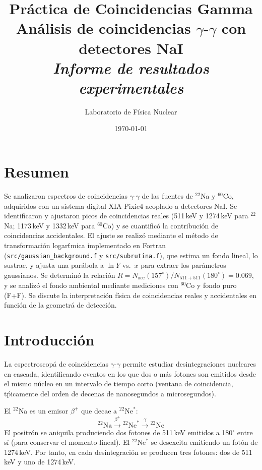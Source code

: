 \documentclass[12pt,a4paper]{article}
\title{\vspace{-1.5cm}\textbf{Pr\'actica de Coincidencias Gamma}\\
       \large An\'alisis de coincidencias $\gamma$-$\gamma$ con detectores NaI\\[0.3cm]
       \normalsize\textit{Informe de resultados experimentales}}
\author{Laboratorio de F\'isica Nuclear}
\date{\today}
\begin{document}
\maketitle
\thispagestyle{empty}

\section*{Resumen}

Se analizaron espectros de coincidencias $\gamma$-$\gamma$ de las fuentes de $^{22}$Na y $^{60}$Co,
adquiridos con un sistema digital XIA Pixie4 acoplado a detectores NaI.
Se identificaron y ajustaron picos de coincidencias reales (511\,keV y 1274\,keV para $^{22}$Na;
1173\,keV y 1332\,keV para $^{60}$Co) y se cuantific\'o la contribuci\'on de coincidencias accidentales.
El ajuste se realiz\'o mediante el m\'etodo de transformaci\'on logar\'tmica implementado en
Fortran (\texttt{src/gaussian\_background.f} y \texttt{src/subrutina.f}), que estima un fondo
lineal, lo sustrae, y ajusta una par\'abola a $\ln Y$ vs.\ $x$ para extraer los par\'ametros
gaussianos.
Se determin\'o la relaci\'on $R = N_{\text{acc}}(157^\circ)/N_{511+511}(180^\circ) = 0.069$,
y se analiz\'o el fondo ambiental mediante mediciones con $^{60}$Co y fondo puro (F+F).
Se discute la interpretaci\'on f\'isica de coincidencias reales y accidentales
en funci\'on de la geometr\'a de detecci\'on.

\newpage
\setcounter{section}{1}

\section{Introducci\'on}

La espectroscop\'a de coincidencias $\gamma$-$\gamma$ permite estudiar desintegraciones nucleares
en cascada, identificando eventos en los que dos o m\'as fotones son emitidos desde el mismo
n\'ucleo en un intervalo de tiempo corto (ventana de coincidencia, t\'picamente del orden de
decenas de nanosegundos a microsegundos).

El $^{22}$Na es un emisor $\beta^+$ que decae a $^{22}$Ne$^*$:
\begin{equation}
{}^{22}\text{Na} \xrightarrow{\beta^+} {}^{22}\text{Ne}^* \xrightarrow{\gamma} {}^{22}\text{Ne}
\end{equation}
El positr\'on se aniquila produciendo dos fotones de 511\,keV emitidos a 180$^\circ$ entre s\'i
(para conservar el momento lineal). El $^{22}$Ne$^*$ se desexcita emitiendo un fot\'on de
1274\,keV. Por tanto, en cada desintegraci\'on se producen tres fotones: dos de 511\,keV y
uno de 1274\,keV.
\end{document}
